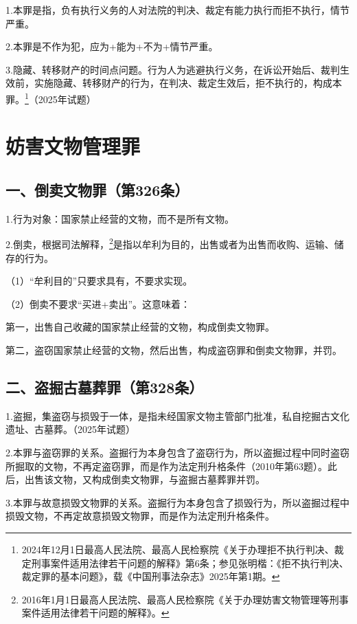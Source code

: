 1.本罪是指，负有执行义务的人对法院的判决、裁定有能力执行而拒不执行，情节严重。

2.本罪是不作为犯，应为+能为+不为+情节严重。

3.隐藏、转移财产的时间点问题。行为人为逃避执行义务，在诉讼开始后、裁判生效前，实施隐藏、转移财产的行为，在判决、裁定生效后，拒不执行的，构成本罪。\footnote{2024年12月1日最高人民法院、最高人民检察院《关于办理拒不执行判决、裁定刑事案件适用法律若干问题的解释》第6条；参见张明楷：《拒不执行判决、裁定罪的基本问题》，载《中国刑事法杂志》2025年第1期。}（2025年试题）

\section{妨害文物管理罪}

\subsection*{一、倒卖文物罪（第326条）}

1.行为对象：国家禁止经营的文物，而不是所有文物。

2.倒卖，根据司法解释，\footnote{2016年1月1日最高人民法院、最高人民检察院《关于办理妨害文物管理等刑事案件适用法律若干问题的解释》。}是指以牟利为目的，出售或者为出售而收购、运输、储存的行为。

（1）“牟利目的”只要求具有，不要求实现。

（2）倒卖不要求“买进+卖出”。这意味着：

第一，出售自己收藏的国家禁止经营的文物，构成倒卖文物罪。

第二，盗窃国家禁止经营的文物，然后出售，构成盗窃罪和倒卖文物罪，并罚。

\subsection*{二、盗掘古墓葬罪（第328条）}

1.盗掘，集盗窃与损毁于一体，是指未经国家文物主管部门批准，私自挖掘古文化遗址、古墓葬。（2025年试题）

2.本罪与盗窃罪的关系。盗掘行为本身包含了盗窃行为，所以盗掘过程中同时盗窃所掘取的文物，不再定盗窃罪，而是作为法定刑升格条件（2010年第63题）。此后，出售该文物，又构成倒卖文物罪，与盗掘古墓葬罪并罚。

3.本罪与故意损毁文物罪的关系。盗掘行为本身包含了损毁行为，所以盗掘过程中损毁文物，不再定故意损毁文物罪，而是作为法定刑升格条件。


